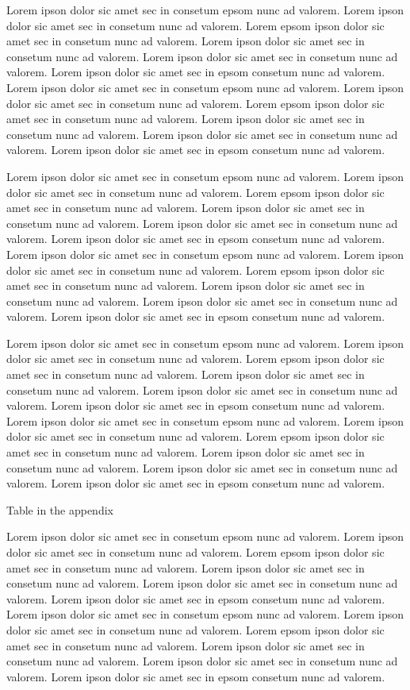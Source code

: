 Lorem ipson dolor sic amet sec in consetum epsom nunc ad valorem. Lorem ipson dolor sic amet
sec in consetum nunc ad valorem. Lorem epsom ipson dolor sic amet sec in consetum nunc ad valorem.
Lorem ipson dolor sic amet sec in consetum nunc ad valorem. Lorem ipson dolor sic amet
sec in consetum nunc ad valorem. Lorem ipson dolor sic amet sec in epsom consetum nunc ad valorem.
Lorem ipson dolor sic amet sec in consetum epsom nunc ad valorem. Lorem ipson dolor sic amet
sec in consetum nunc ad valorem. Lorem epsom ipson dolor sic amet sec in consetum nunc ad valorem.
Lorem ipson dolor sic amet sec in consetum nunc ad valorem. Lorem ipson dolor sic amet
sec in consetum nunc ad valorem. Lorem ipson dolor sic amet sec in epsom consetum nunc ad valorem.

Lorem ipson dolor sic amet sec in consetum epsom nunc ad valorem. Lorem ipson dolor sic amet
sec in consetum nunc ad valorem. Lorem epsom ipson dolor sic amet sec in consetum nunc ad valorem.
Lorem ipson dolor sic amet sec in consetum nunc ad valorem. Lorem ipson dolor sic amet
sec in consetum nunc ad valorem. Lorem ipson dolor sic amet sec in epsom consetum nunc ad valorem.
Lorem ipson dolor sic amet sec in consetum epsom nunc ad valorem. Lorem ipson dolor sic amet
sec in consetum nunc ad valorem. Lorem epsom ipson dolor sic amet sec in consetum nunc ad valorem.
Lorem ipson dolor sic amet sec in consetum nunc ad valorem. Lorem ipson dolor sic amet
sec in consetum nunc ad valorem. Lorem ipson dolor sic amet sec in epsom consetum nunc ad valorem.

Lorem ipson dolor sic amet sec in consetum epsom nunc ad valorem. Lorem ipson dolor sic amet
sec in consetum nunc ad valorem. Lorem epsom ipson dolor sic amet sec in consetum nunc ad valorem.
Lorem ipson dolor sic amet sec in consetum nunc ad valorem. Lorem ipson dolor sic amet
sec in consetum nunc ad valorem. Lorem ipson dolor sic amet sec in epsom consetum nunc ad valorem.
Lorem ipson dolor sic amet sec in consetum epsom nunc ad valorem. Lorem ipson dolor sic amet
sec in consetum nunc ad valorem. Lorem epsom ipson dolor sic amet sec in consetum nunc ad valorem.
Lorem ipson dolor sic amet sec in consetum nunc ad valorem. Lorem ipson dolor sic amet
sec in consetum nunc ad valorem. Lorem ipson dolor sic amet sec in epsom consetum nunc ad valorem.
\begin{table}
\caption{Table in the appendix}
\end{table}
Lorem ipson dolor sic amet sec in consetum epsom nunc ad valorem. Lorem ipson dolor sic amet
sec in consetum nunc ad valorem. Lorem epsom ipson dolor sic amet sec in consetum nunc ad valorem.
Lorem ipson dolor sic amet sec in consetum nunc ad valorem. Lorem ipson dolor sic amet
sec in consetum nunc ad valorem. Lorem ipson dolor sic amet sec in epsom consetum nunc ad valorem.
Lorem ipson dolor sic amet sec in consetum epsom nunc ad valorem. Lorem ipson dolor sic amet
sec in consetum nunc ad valorem. Lorem epsom ipson dolor sic amet sec in consetum nunc ad valorem.
Lorem ipson dolor sic amet sec in consetum nunc ad valorem. Lorem ipson dolor sic amet
sec in consetum nunc ad valorem. Lorem ipson dolor sic amet sec in epsom consetum nunc ad valorem.

